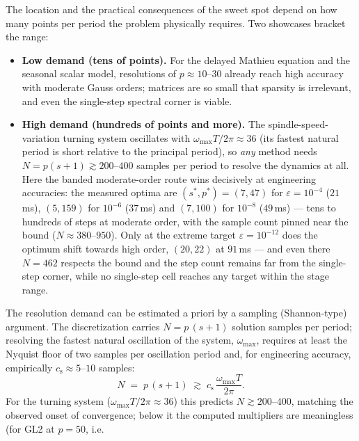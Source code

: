 \documentclass[Afour,sageh,times]{sagej}
\begin{document}
The location and the practical consequences of the sweet spot depend on how many
points per period the problem physically requires. Two showcases bracket the
range:
\begin{itemize}
  \item \textbf{Low demand (tens of points).} For the delayed Mathieu
        equation and the seasonal scalar model, resolutions of
        $p \approx 10$--$30$ already reach high accuracy with moderate Gauss
        orders; matrices are so
        small that sparsity is irrelevant, and even the single-step spectral
        corner is viable.
  \item \textbf{High demand (hundreds of points and more).} The
        spindle-speed-variation turning system oscillates with
        $\omega_{\max}T/2\pi \approx 36$ (its fastest natural period is
        short relative to the principal period), so \emph{any} method needs
        $N = p(s{+}1) \gtrsim 200$--$400$
        samples per period to resolve the dynamics at all. Here the banded
        moderate-order route wins decisively at engineering accuracies: the
        measured optima are $(s^\ast, p^\ast) = (7, 47)$ for
        $\varepsilon = 10^{-4}$ ($21$\,ms), $(5, 159)$ for $10^{-6}$
        ($37$\,ms) and $(7, 100)$ for $10^{-8}$ ($49$\,ms) --- tens to
        hundreds of steps at moderate order, with the sample count pinned
        near the bound ($N \approx 380$--$950$). Only at the extreme target
        $\varepsilon = 10^{-12}$ does the optimum shift towards high order,
        $(20, 22)$ at $91$\,ms --- and even there $N = 462$ respects the
        bound and the step count remains far from the single-step corner,
        while no single-step cell reaches any target within the stage range.
\end{itemize}
The resolution demand can be estimated a priori by a sampling (Shannon-type)
argument. The discretization carries $N = p\,(s{+}1)$ solution samples per
period; resolving the fastest natural oscillation of the system,
$\omega_{\max}$, requires at least the Nyquist floor of two samples per
oscillation period and, for engineering accuracy, empirically
$c_\mathrm{s} \approx 5$--$10$ samples:
\begin{equation}
  N \;=\; p\,(s{+}1) \;\gtrsim\; c_\mathrm{s}\,\frac{\omega_{\max} T}{2\pi}.
  \label{eq:nyquist}
\end{equation}
For the turning system ($\omega_{\max}T/2\pi \approx 36$) this predicts
$N \gtrsim 200$--$400$, matching the observed onset of convergence; below it
the computed multipliers are meaningless (for GL2 at $p = 50$, i.e.\
\end{document}

